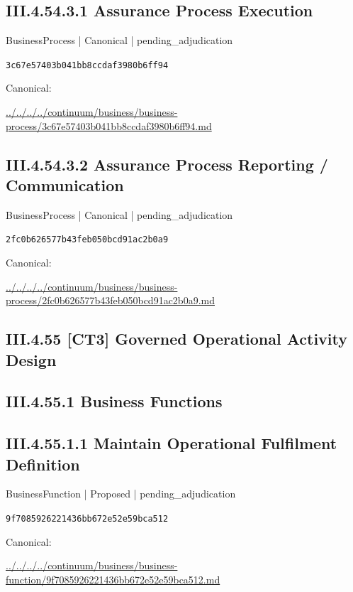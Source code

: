 \documentclass[10pt,a4paper]{article}
\begin{document}
\subsection*{III.4.54.3.1 Assurance Process Execution}
{\small BusinessProcess | Canonical | pending\_adjudication}\par
\texttt{3c67e57403b041bb8ccdaf3980b6ff94}\par
Canonical: \par
{\footnotesize\url{../../../../continuum/business/business-process/3c67e57403b041bb8ccdaf3980b6ff94.md}}\par
\subsection*{III.4.54.3.2 Assurance Process Reporting / Communication}
{\small BusinessProcess | Canonical | pending\_adjudication}\par
\texttt{2fc0b626577b43feb050bcd91ac2b0a9}\par
Canonical: \par
{\footnotesize\url{../../../../continuum/business/business-process/2fc0b626577b43feb050bcd91ac2b0a9.md}}\par
\subsection*{III.4.55 [CT3] Governed Operational Activity Design}
\subsection*{III.4.55.1 Business Functions}
\subsection*{III.4.55.1.1 Maintain Operational Fulfilment Definition}
{\small BusinessFunction | Proposed | pending\_adjudication}\par
\texttt{9f7085926221436bb672e52e59bca512}\par
Canonical: \par
{\footnotesize\url{../../../../continuum/business/business-function/9f7085926221436bb672e52e59bca512.md}}\par
\end{document}
